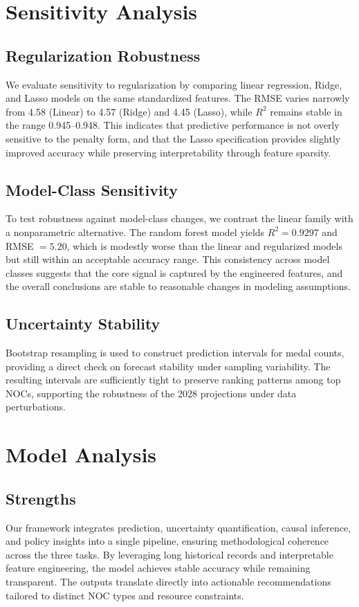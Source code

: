 \documentclass{mcmthesis}
\begin{document}
\section{Sensitivity Analysis}
\subsection{Regularization Robustness}
We evaluate sensitivity to regularization by comparing linear regression, Ridge, and Lasso models on the same standardized features. The RMSE varies narrowly from 4.58 (Linear) to 4.57 (Ridge) and 4.45 (Lasso), while $R^2$ remains stable in the range 0.945--0.948. This indicates that predictive performance is not overly sensitive to the penalty form, and that the Lasso specification provides slightly improved accuracy while preserving interpretability through feature sparsity.

\subsection{Model-Class Sensitivity}
To test robustness against model-class changes, we contrast the linear family with a nonparametric alternative. The random forest model yields $R^2=0.9297$ and RMSE $=5.20$, which is modestly worse than the linear and regularized models but still within an acceptable accuracy range. This consistency across model classes suggests that the core signal is captured by the engineered features, and the overall conclusions are stable to reasonable changes in modeling assumptions.

\subsection{Uncertainty Stability}
Bootstrap resampling is used to construct prediction intervals for medal counts, providing a direct check on forecast stability under sampling variability. The resulting intervals are sufficiently tight to preserve ranking patterns among top NOCs, supporting the robustness of the 2028 projections under data perturbations.

\section{Model Analysis}
\subsection{Strengths}
Our framework integrates prediction, uncertainty quantification, causal inference, and policy insights into a single pipeline, ensuring methodological coherence across the three tasks. By leveraging long historical records and interpretable feature engineering, the model achieves stable accuracy while remaining transparent. The outputs translate directly into actionable recommendations tailored to distinct NOC types and resource constraints.
\end{document}
